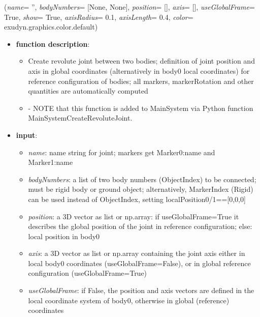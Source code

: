 %
\begin{flushleft}
\label{sec:mainsystemextensions:CreateRevoluteJoint}
({\it name}= '', {\it bodyNumbers}= [None, None], {\it position}= [], {\it axis}= [], {\it useGlobalFrame}= True, {\it show}= True, {\it axisRadius}= 0.1, {\it axisLength}= 0.4, {\it color}= exudyn.graphics.color.default)
\end{flushleft}
\setlength{\itemindent}{0.7cm}
\begin{itemize}[leftmargin=0.7cm]
\item[--]
{\bf function description}: \vspace{-6pt}
\begin{itemize}[leftmargin=1.2cm]
\setlength{\itemindent}{-0.7cm}
\item[]Create revolute joint between two bodies; definition of joint position and axis in global coordinates (alternatively in body0 local coordinates) for reference configuration of bodies; all markers, markerRotation and other quantities are automatically computed
\item[]- NOTE that this function is added to MainSystem via Python function MainSystemCreateRevoluteJoint.
\end{itemize}
\item[--]
{\bf input}: \vspace{-6pt}
\begin{itemize}[leftmargin=1.2cm]
\setlength{\itemindent}{-0.7cm}
\item[]{\it name}: name string for joint; markers get Marker0:name and Marker1:name
\item[]{\it bodyNumbers}: a list of two body numbers (ObjectIndex) to be connected; must be rigid body or ground object; alternatively, MarkerIndex (Rigid) can be used instead of ObjectIndex, setting localPosition0/1==[0,0,0]
\item[]{\it position}: a 3D vector as list or np.array: if useGlobalFrame=True it describes the global position of the joint in reference configuration; else: local position in body0
\item[]{\it axis}: a 3D vector as list or np.array containing the joint axis either in local body0 coordinates (useGlobalFrame=False), or in global reference configuration (useGlobalFrame=True)
\item[]{\it useGlobalFrame}: if False, the position and axis vectors are defined in the local coordinate system of body0, otherwise in global (reference) coordinates

\end{itemize}
\end{itemize}
